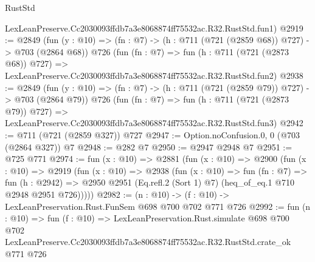 \begin{lexlean}{RustStd}
\begin{coremodule}
    LexLeanPreserve.Cc2030093ffdb7a3e8068874ff75532ac.R32.RustStd.fun1)
@2919 := @2849
    (fun (y : @10) => (fn : @7) -> (h : @711 (@721 (@2859 @68)) @727) -> @703 (@2864 @68))
    @726
    (fun (fn : @7) =>
    fun (h : @711 (@721 (@2873 @68)) @727) =>
    LexLeanPreserve.Cc2030093ffdb7a3e8068874ff75532ac.R32.RustStd.fun2)
@2938 := @2849
    (fun (y : @10) => (fn : @7) -> (h : @711 (@721 (@2859 @79)) @727) -> @703 (@2864 @79))
    @726
    (fun (fn : @7) =>
    fun (h : @711 (@721 (@2873 @79)) @727) =>
    LexLeanPreserve.Cc2030093ffdb7a3e8068874ff75532ac.R32.RustStd.fun3)
@2942 := @711 (@721 (@2859 @327)) @727
@2947 := Option.noConfusion.{0, 0} (@703 (@2864 @327)) @7
@2948 := @282 @7
@2950 := @2947 @2948 @7
@2951 := @725 @771
@2974 := fun (x : @10) =>
  @2881
    (fun (x : @10) =>
    @2900
      (fun (x : @10) =>
      @2919
        (fun (x : @10) =>
        @2938
          (fun (x : @10) =>
          fun (fn : @7) =>
          fun (h : @2942) =>
          @2950 @2951 (Eq.refl.{2} (Sort 1) @7) (heq_of_eq.{1} @710 @2948 @2951 @726)))))
@2982 := (n : @10) -> (f : @10) -> LexLeanPreservation.Rust.FunSem @698 @700 @702 @771 @726
@2992 := fun (n : @10) =>
  fun (f : @10) =>
  LexLeanPreservation.Rust.simulate
    @698
    @700
    @702
    LexLeanPreserve.Cc2030093ffdb7a3e8068874ff75532ac.R32.RustStd.crate_ok
    @771
    @726
\end{coremodule}
\end{lexlean}
